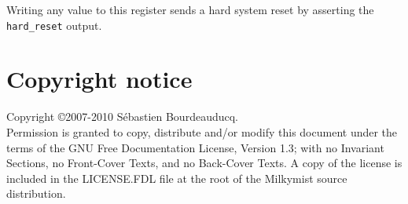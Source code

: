 \documentclass[a4paper,11pt]{article}
\begin{document}
Writing any value to this register sends a hard system reset by asserting the \verb!hard_reset! output.

\section*{Copyright notice}
Copyright \copyright 2007-2010 S\'ebastien Bourdeauducq. \\
Permission is granted to copy, distribute and/or modify this document under the terms of the GNU Free Documentation License, Version 1.3; with no Invariant Sections, no Front-Cover Texts, and no Back-Cover Texts. A copy of the license is included in the LICENSE.FDL file at the root of the Milkymist source distribution.
\end{document}
